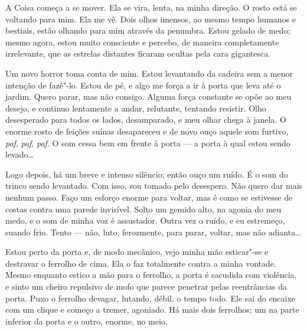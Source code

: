 A Coisa começa a se mover. Ela se vira, lenta, na minha direção. O rosto está se voltando para mim. Ela me vê. Dois
olhos imensos, ao mesmo tempo humanos e bestiais, estão olhando para mim através da penumbra. Estou gelado de medo;
mesmo agora, estou muito consciente e percebo, de maneira completamente irrelevante, que as estrelas distantes ficaram
ocultas pela cara gigantesca.

Um novo horror toma conta de mim. Estou levantando da cadeira sem a menor intenção de fazê"-lo. Estou de pé, e algo me
força a ir à porta que leva até o jardim. Quero parar, mas não consigo. Alguma força constante se opõe ao meu desejo, e
continuo lentamente a andar, relutante, tentando resistir. Olho desesperado para todos os lados, desamparado, e meu
olhar chega à janela. O enorme rosto de feições suínas desapareceu e de novo ouço aquele som furtivo, \textit{paf},
\textit{paf}, \textit{paf}. O som cessa bem em frente à porta --- a porta à qual estou sendo levado\ldots{}

Logo depois, há um breve e intenso silêncio; então ouço um ruído. É o som do trinco sendo levantado. Com isso, sou
tomado pelo desespero. Não quero dar mais nenhum passo. Faço um esforço enorme para voltar, mas é como se estivesse de
costas contra uma parede invisível. Solto um gemido alto, na agonia do meu medo, e o som de minha voz é assustador.
Outra vez o ruído, e eu estremeço, suando frio. Tento --- não, luto, ferozmente, para parar, voltar, mas não adianta\ldots{}

Estou perto da porta e, de modo mecânico, vejo minha mão esticar"-se e destravar o ferrolho de cima. Ela o faz
totalmente contra a minha vontade. Mesmo enquanto estico a mão para o ferrolho, a porta é sacudida com violência, e
sinto um cheiro repulsivo de mofo que parece penetrar pelas reentrâncias da porta. Puxo o ferrolho devagar, lutando,
débil, o tempo todo. Ele sai do encaixe com um clique e começo a tremer, agoniado. Há mais dois ferrolhos; um na
parte inferior da porta e o outro, enorme, no meio.

